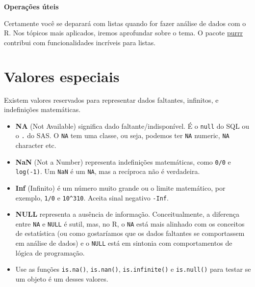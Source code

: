 \documentclass[
]{book}
\newenvironment{Shaded}{\begin{snugshade}}{\end{snugshade}}
\newcommand{\CommentTok}[1]{\textcolor[rgb]{0.56,0.35,0.01}{\textit{#1}}}
\newcommand{\DecValTok}[1]{\textcolor[rgb]{0.00,0.00,0.81}{#1}}
\newcommand{\NormalTok}[1]{#1}
\newcommand{\OperatorTok}[1]{\textcolor[rgb]{0.81,0.36,0.00}{\textbf{#1}}}
\newcommand{\StringTok}[1]{\textcolor[rgb]{0.31,0.60,0.02}{#1}}
\providecommand{\tightlist}{%
  \setlength{\itemsep}{0pt}\setlength{\parskip}{0pt}}
\begin{document}
\textbf{Operações úteis}

\begin{Shaded}
\end{Shaded}

Certamente você se deparará com listas quando for fazer análise de dados com o R. Nos tópicos mais aplicados, iremos aprofundar sobre o tema. O pacote \href{https://github.com/hadley/purrr}{purrr} contribui com funcionalidades incríveis para listas.

\hypertarget{valores-especiais}{%
\section{Valores especiais}\label{valores-especiais}}

Existem valores reservados para representar dados faltantes, infinitos, e indefinições matemáticas.

\begin{itemize}
\tightlist
\item
  \textbf{NA} (Not Available) significa dado faltante/indisponível. É o \texttt{null} do SQL ou o \texttt{.} do SAS. O \texttt{NA} tem uma classe, ou seja, podemos ter \texttt{NA} numeric, \texttt{NA} character etc.
\item
  \textbf{NaN} (Not a Number) representa indefinições matemáticas, como \texttt{0/0} e \texttt{log(-1)}. Um \texttt{NaN} é um \texttt{NA}, mas a recíproca não é verdadeira.
\item
  \textbf{Inf} (Infinito) é um número muito grande ou o limite matemático, por exemplo, \texttt{1/0} e \texttt{10\^{}310}. Aceita sinal negativo \texttt{-Inf}.
\item
  \textbf{NULL} representa a ausência de informação. Conceitualmente, a diferença entre \texttt{NA} e \texttt{NULL} é sutil, mas, no R, o \texttt{NA} está mais alinhado com os conceitos de estatística (ou como gostaríamos que os dados faltantes se comportassem em análise de dados) e o \texttt{NULL} está em sintonia com comportamentos de lógica de programação.
\item
  Use as funções \texttt{is.na()}, \texttt{is.nan()}, \texttt{is.infinite()} e \texttt{is.null()} para testar se um objeto é um desses valores.
\end{itemize}
\end{document}
